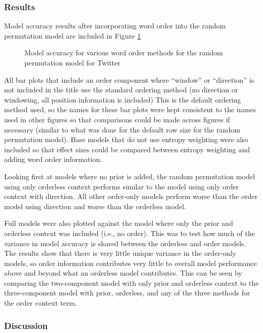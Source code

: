 \documentclass[man,floatsintext,donotrepeattitle]{apa6}
\begin{document}
\subsubsection{Results}

Model accuracy results after incorporating word order into the random permutation model are included in Figure \ref{figContextOrder}

\begin{figure}[!htbp]
  \caption{Model accuracy for various word order methods for the random permutation model for Twitter}
  \label{figContextOrder}
\end{figure}

All bar plots that include an order component where ``window'' or ``direction'' is not included in the title use the standard ordering method (no direction or windowing, all position information is included) 
This is the default ordering method used, so the names for these bar plots were kept consistent to the names used in other figures so that comparisons could be made across figures if necessary
(similar to what was done for the default row size for the random permutation model).
Base models that do not use entropy weighting were also included so that effect sizes could be compared between entropy weighting and adding word order information.

Looking first at models where no prior is added, the random permutation model using only orderless context performs similar to the model using only order context with direction.
All other order-only models perform worse than the order model using direction and worse than the orderless model.

Full models were also plotted against the model where only the prior and orderless context was included (i.e., no order).
This was to test how much of the variance in model accuracy is shared between the orderless and order models.
The results show that there is very little unique variance in the order-only models, so order information contributes very little to overall model performance above and beyond what an orderless model contributes.
This can be seen by comparing the two-component model with only prior and orderless context to the three-component model with prior, orderless, and any of the three methods for the order context term.

\subsubsection{Discussion}
\end{document}
